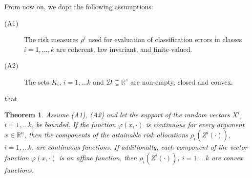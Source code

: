 \documentclass[10pt,letterpaper]{article}
\newcommand{\R}{\mathbb{R}}
\newcommand{\Dc}{\mathcal{D}}
\newcommand{\1}{1{\hskip -2.55 pt}\hbox{I}}
\newtheorem{theorem}{Theorem}
\begin{document}
From now on, we dopt the following assumptions:
\begin{description}
  \item[(A1)] The risk measures $\rho^i$ used for evaluation of classification errors in classes $i=1,...,k$
are coherent, law invariant, and finite-valued.
\item[(A2)] The sets $K_i$, $i=1,\dots k$ and  $\Dc\subseteq\R^s$ are non-empty, closed and convex. 
\end{description}
that  
\begin{theorem}
\label{t:continuity}
Assume (A1), (A2) and let the support of the random vectors $X^i$,  $i=1,\dots k$, be bounded. 
If the function $\varphi(x,\cdot)$ is continuous for every argument $x\in\R^n$, then the components of the attainable risk allocations 
$\rho_i(Z^i(\cdot))$, $i=1,\dots k$, are continuous functions.
If additionally, each component of the vector function $\varphi(x,\cdot)$ is an affine function, then $\rho_i(Z^i(\cdot))$, $i=1,\dots k$ are convex functions.
\end{theorem}
\end{document}

